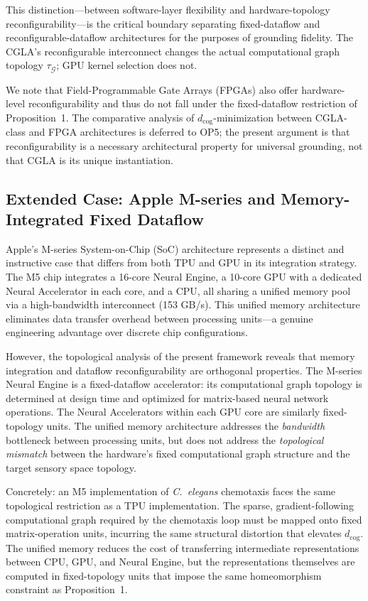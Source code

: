\documentclass[12pt]{article}
\begin{document}
This distinction---between software-layer flexibility and
hardware-topology reconfigurability---is the critical boundary
separating fixed-dataflow and reconfigurable-dataflow
architectures for the purposes of grounding fidelity. The CGLA's
reconfigurable interconnect changes the actual computational
graph topology $\tau_{\mathcal{G}}$; GPU kernel selection does not.

We note that Field-Programmable Gate Arrays (FPGAs) also offer
hardware-level reconfigurability and thus do not fall under the
fixed-dataflow restriction of Proposition~1. The comparative analysis
of $d_{\mathrm{cog}}$-minimization between CGLA-class and FPGA
architectures is deferred to OP5; the present argument is that
reconfigurability is a necessary architectural property for universal
grounding, not that CGLA is its unique instantiation.

\subsection{Extended Case: Apple M-series and Memory-Integrated Fixed Dataflow}

Apple's M-series System-on-Chip (SoC) architecture represents a
distinct and instructive case that differs from both TPU and GPU in
its integration strategy. The M5 chip \cite{apple2025m5} integrates
a 16-core Neural Engine, a 10-core GPU with a dedicated Neural
Accelerator in each core, and a CPU, all sharing a unified memory
pool via a high-bandwidth interconnect (153 GB/s). This unified
memory architecture eliminates data transfer overhead between
processing units---a genuine engineering advantage over discrete
chip configurations.

However, the topological analysis of the present framework reveals
that memory integration and dataflow reconfigurability are orthogonal
properties. The M-series Neural Engine is a fixed-dataflow
accelerator: its computational graph topology is determined at
design time and optimized for matrix-based neural network operations.
The Neural Accelerators within each GPU core are similarly
fixed-topology units. The unified memory architecture addresses the
\emph{bandwidth} bottleneck between processing units, but does not
address the \emph{topological mismatch} between the hardware's fixed
computational graph structure and the target sensory space topology.

Concretely: an M5 implementation of \textit{C.~elegans} chemotaxis
faces the same topological restriction as a TPU implementation.
The sparse, gradient-following computational graph required by the
chemotaxis loop must be mapped onto fixed matrix-operation units,
incurring the same structural distortion that elevates
$d_{\mathrm{cog}}$. The unified memory reduces the cost of
transferring intermediate representations between CPU, GPU, and
Neural Engine, but the representations themselves are computed in
fixed-topology units that impose the same homeomorphism constraint
as Proposition~1.
\end{document}
